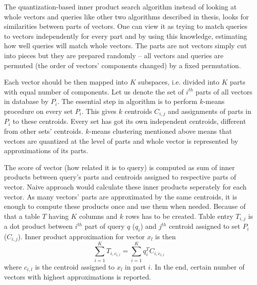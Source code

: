The quantization-based inner product search algorithm \cite{quantization}
instead of looking at whole vectors and queries like other two algorithms described in thesis,
looks for similarities between parts of vectors.
One can view it as trying to match queries to vectors independently for every part and
by using this knowledge, estimating how well queries will match whole vectors.
The parts are not vectors simply cut into pieces but they are prepared randomly
 -- all vectors and queries are permuted (the order of vectors' components changed)
by a fixed permutation.
\par
Each vector should be then mapped into $K$ subspaces, i.e. divided into $K$ parts with equal number of components.
Let us denote the set of $i^{th}$ parts of all vectors in database by $P_i$.
The essential step in algorithm is to perform $k$-means procedure on every set $P_i$.
This gives $k$ centroids $C_{i,j}$ and assignments of parts in $P_i$ to these centroids.
Every set has got its own independent centroids, different from other sets' centroids.
$k$-means clustering mentioned above means that vectors are quantized at the level of parts
and whole vector is represented by approximations of its parts.
\par
The score of vector (how related it is to query) is computed as sum of inner products
between query's parts and centroids assigned to respective parts of vector.
Naive approach would calculate these inner products seperately for each vector.
As many vectors' parts are approximated by the same centroids, it is enough to compute
these products once and use them when needed.
Because of that a table $T$ having $K$ columns and $k$ rows has to be created.
Table entry $T_{i,j}$ is a dot product between $i^{th}$ part of query $q$ ($q_i$) and $j^{th}$
centroid assigned to set $P_i$ ($C_{i,j}$).
Inner product approximation for vector $x_l$ is then
$$\sum_{i=1}^{K} T_{i,c_{i,l}} = \sum_{i=1}^{K} q_i^T C_{i,c_{i,l}}$$ where $c_{i,l}$ is
the centroid assigned to $x_l$ in part $i$.
In the end, certain number of vectors with highest approximations is reported.

